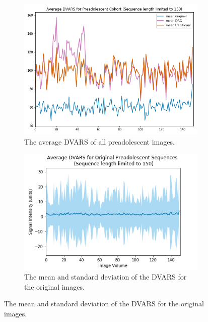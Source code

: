 \begin{figure}[t]
	\centering
	\begin{subfigure}{0.45\textwidth}
		\centering
		\includegraphics[width=1\textwidth]{6/figures/pread_dvars_all_150_avg.png}
		\caption{The average DVARS of all preadolescent images.}
	\end{subfigure}%
	\vspace{0.05\textwidth}
	\begin{subfigure}{0.45\textwidth}
		\centering
		\includegraphics[width=1\textwidth]{6/figures/pread-bold-dvars-150.png}
		\caption{The mean and standard deviation of the DVARS for the original images.}
	\end{subfigure}
	

\end{figure}

